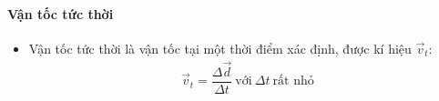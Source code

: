 \paragraph{Vận tốc tức thời} 
\begin{itemize}
\item Vận tốc tức thời là vận tốc tại một thời điểm xác định, được kí hiệu $\vec v_t$:
\begin{align*}
\vec v_t=\dfrac{\Delta \vec d}{\Delta t}\ \text{với}\ \Delta t \ \text{rất nhỏ}
\end{align*}
\end{itemize}


